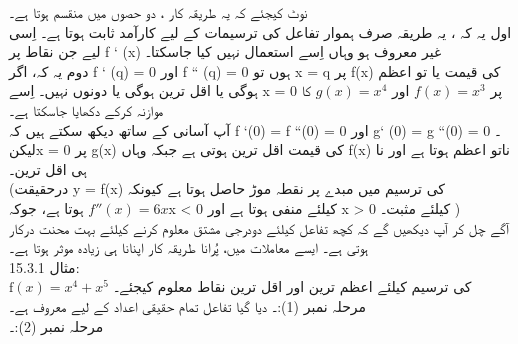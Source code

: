 نوٹ کیجئے کہ یہ طریقہ کار ، دو حصوں میں منقسم ہوتا ہے۔\\
اول یہ کہ ،  یہ طریقہ صرف ہموار تفاعل کی ترسیمات کے لیے کارآمد ثابت ہوتا ہے۔ اِسی لیے جن نقاط پر f ` (x) غیر معروف ہو وہاں اِسے استعمال نہیں کیا جاسکتا۔ \\
دوم یہ کہ، اگر f ` (q) = 0  اور   f `` (q) = 0 ہوں تو  x = q پر f(x) کی قیمت یا تو اعظم ہوگی یا اقل ترین ہوگی یا  دونوں نہیں۔ اِسے x = 0 پر
 \(f(x) = x^{3}\)
  اور
   \(g(x) = x^{4}\)
    کا موازنہ کرکے دکھایا جاسکتا ہے۔\\

 آپ آسانی کے ساتھ دیکھ سکتے ہیں کہ f `(0) = f ``(0) = 0 اور g` (0) = g ``(0) = 0 ۔\\
 لیکنx = 0   پر g(x)  کی قیمت اقل ترین ہوتی ہے جبکہ وہاں f(x) ناتو اعظم ہوتا ہے اور نا ہی اقل ترین۔\\
(درحقیقت  y = f(x)  کی ترسیم میں مبدے پر نقطہ موڑ حاصل ہوتا ہے کیونکہ   
\(f''(x)=6x\)
ہوتا ہے، جوکہx < 0  کیلئے منفی ہوتا ہے اور x > 0 کیلئے مثبت۔ )\\
آگے چل کر آپ دیکھیں گے کہ کچھ تفاعل کیلئے دودرجی مشتق معلوم کرنے کیلئے بہت محنت درکار ہوتی ہے۔ ایسے معاملات میں،  پُرانا طریقہ کار اپنانا ہی زیادہ موثر ہوتا ہے۔ \\

15.3.1 مثال:\\
\( \text{f}(x) = x^{4} + x^{5} \)
 کی ترسیم کیلئے اعظم ترین اور اقل ترین نقاط معلوم کیجئے۔ \\
مرحلہ نمبر (1):۔ دیا گیا تفاعل تمام حقیقی اعداد کے لیے معروف  ہے۔ \\
مرحلہ نمبر (2):۔ 

